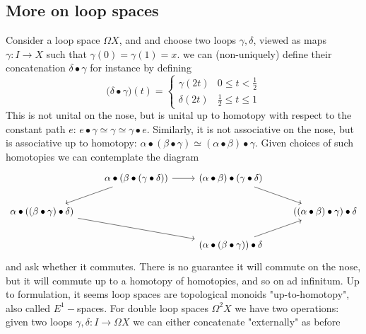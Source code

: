 \subsection{More on loop spaces}
Consider a loop space $\Omega X$, and and choose two loops $\gamma,\delta$, viewed as maps $\gamma:I\rightarrow X$ such that $\gamma(0)=\gamma(1)=x$.  we can (non-uniquely) define their concatenation $\delta\bullet\gamma$ for instance by defining
$$\big(\delta\bullet\gamma\big)(t)=\begin{cases} 
      \gamma(2t) & 0\leq t <\frac{1}{2} \\
      \delta(2t) & \frac{1}{2} \leq t \leq 1
   \end{cases}$$
This is not unital on the nose, but is unital up to homotopy with respect to the constant path $e$: $e\bullet \gamma \simeq \gamma \simeq \gamma \bullet e$. Similarly, it is not associative on the nose, but is associative up to homotopy: $\alpha \bullet (\beta \bullet \gamma)\simeq (\alpha \bullet \beta) \bullet \gamma $. Given choices of such homotopies we can contemplate the diagram
\[%
\begin{tikzcd}
                                                               & \alpha\bullet(\beta \bullet(\gamma\bullet \delta)) \arrow[ld] \arrow[r] & (\alpha\bullet \beta )\bullet(\gamma\bullet \delta) \arrow[rd] &                                                     \\
\alpha\bullet((\beta \bullet\gamma)\bullet \delta) \arrow[rrd] &                                                                         &                                                                & ((\alpha\bullet \beta )\bullet\gamma)\bullet \delta \\
                                                               &                                                                         & (\alpha\bullet (\beta \bullet\gamma))\bullet \delta \arrow[ru] &                                                    
\end{tikzcd}\] and ask whether it commutes. There is no guarantee it will commute on the nose, but it will commute up to a homotopy of homotopies, and so on ad infinitum. Up to formulation, it seems loop spaces are topological monoids "up-to-homotopy", also called $E^1-$spaces. For double loop spaces $\Omega^2 X$ we have two operations: given two loops $\gamma,\delta:I\rightarrow \Omega X$ we can either concatenate "externally" as before
